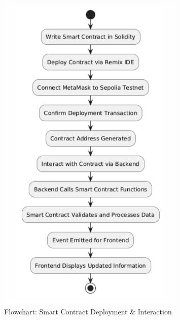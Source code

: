 \newpage
\begin{figure}[htbp]
  \centering
  \includegraphics[width=0.8\textwidth]{images/contract_flowchart.png}
  \caption{Flowchart: Smart Contract Deployment \& Interaction}
  \label{fig:contract-flowchart}
\end{figure}

\newpage

